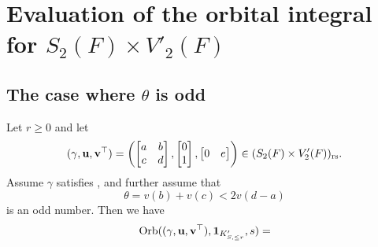 \section{Evaluation of the orbital integral for $S_2(F) \times V'_2(F)$}
\label{sec:orbitalFJ2}
\subsection{The case where $\theta$ is odd}

\begin{theorem}
  Let $r \ge 0$ and let
  \[
    (\gamma, \mathbf u, \mathbf v^\top) = \left( \begin{bmatrix} a & b \\ c & d \end{bmatrix},
      \begin{bmatrix} 0 \\ 1 \end{bmatrix},
      \begin{bmatrix} 0 & e \end{bmatrix} \right)
    \in (S_2(F) \times V_2'(F))_{\mathrm{rs}}.
  \]
  Assume $\gamma$ satisfies , and further assume that
  \[ \theta = v(b) + v(c) < 2 v(d-a) \]
  is an odd number.
  Then we have
  \[
    \operatorname{Orb}((\gamma, \mathbf u, \mathbf v^\top), \mathbf{1}_{K'_{S, \le r}}, s)
    =
  \]
\end{theorem}
